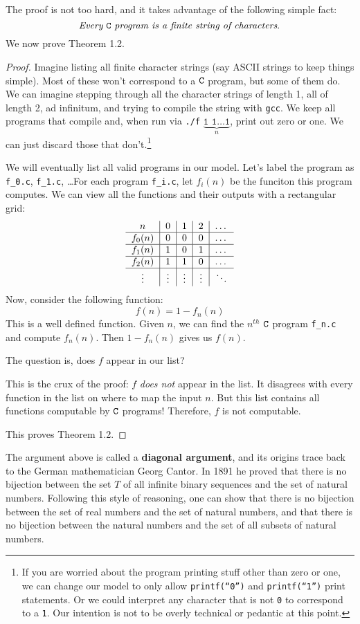 \documentclass[english, 12pt]{article}
\begin{document}
  The proof is not too hard, and it takes advantage of the following simple
  fact:\[\text{ 
  {\it Every} ${\texttt{C}}$ {\it program is a finite string of characters}.
  }\]
  We now prove Theorem 1.2.
  \begin{proof}
  Imagine listing {all finite character strings} (say ASCII strings to 
  keep things simple). Most of these won't correspond to a ${\texttt{C}}$ program,
  but some of them do. We can imagine stepping through all the character 
  strings of length 1, all of length 2, ad infinitum, and trying to compile
  the string with \texttt{gcc}. We keep all programs that compile and,
  when run via 
  \texttt{./f} $\underbrace{\texttt{1 1}\dots\texttt{1}}_{n}$, print out
  zero or one. We can just discard those that don't.\footnote{If you are worried
  about the program printing stuff other than zero or one, we can change our model 
  to only allow \texttt{printf(``0'')} and \texttt{printf(``1'')} print statements. Or
  we could interpret any character that is not \texttt{0} to correspond to a \texttt{1}.
  Our intention is not to be overly technical or pedantic at this point.} \n

  We will eventually list all valid programs in our model. Let's label
  the program as \texttt{f\_0.c}, \texttt{f\_1.c}, \dots For each program
  \texttt{f\_i.c}, let $f_i(n)$ be the funciton this program computes.
  We can view all the functions and their outputs with a rectangular grid:
\[
\begin{tabular}{c|c|c|c|c}
$n$             & $0$   & $1$   & $2$   & \dots \\
\hline
$f_0(n)$ & $0$   & $0$   & $0$   & \dots \\
\hline
$f_1(n)$ & $1$   & $0$   & $1$   & \dots \\
\hline
$f_2(n)$ & $1$ & $1$ & $0$ & \dots \\
\hline
\vdots & \vdots & \vdots & \vdots & $\ddots$
\end{tabular}
\]
  Now, consider the following function:
  \[ f(n) = 1 - f_n(n) \]
  This is a well defined function. Given $n$, we can find the $n^{th}$ ${\texttt{C}}$
  program \texttt{f\_n.c} and compute $f_n(n)$. Then $1 - f_n(n)$ gives us $f(n)$.\n

  The question is, does $f$ appear in our list?\n

  This is the crux of the proof: $f$ {\it does not} appear in the list. 
  It disagrees with every function in the list on where to map the input
  $n$. But this list contains all functions computable by ${\texttt{C}}$ programs! 
  Therefore, $f$ is not computable.\n

  This proves Theorem 1.2.
  \end{proof}
  The argument above is called a {\bf diagonal argument}, and its origins
  trace back to the German mathematician Georg Cantor. In 1891 he proved
  that there is no bijection between the set $T$ of all infinite binary 
  sequences and the set of natural numbers. Following this style of reasoning,
  one can show that there is no bijection between the set of real numbers
  and the set of natural numbers, and that there is no bijection between the
  natural numbers and the set of all subsets of natural numbers. \n
\end{document}
